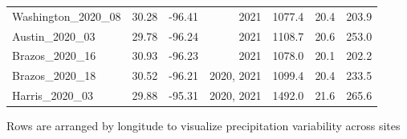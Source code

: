 \begin{table}
{\begin{tabular}{p{5cm}p{3cm}p{3cm}p{3cm}p{3cm}p{3cm}p{3cm}}
            \multicolumn{1}{l}{Washington\_2020\_08} 
            & \multicolumn{1}{r}{30.28}
            & \multicolumn{1}{r}{-96.41}
            & \multicolumn{1}{r}{2021}
            & \multicolumn{1}{r}{1077.4}
            & \multicolumn{1}{r}{20.4}
            & \multicolumn{1}{r}{203.9}
            \\

            \multicolumn{1}{l}{Austin\_2020\_03} 
            & \multicolumn{1}{r}{29.78}
            & \multicolumn{1}{r}{-96.24}
            & \multicolumn{1}{r}{2021}
            & \multicolumn{1}{r}{1108.7}
            & \multicolumn{1}{r}{20.6}
            & \multicolumn{1}{r}{253.0}
            \\

            \multicolumn{1}{l}{Brazos\_2020\_16} 
            & \multicolumn{1}{r}{30.93}
            & \multicolumn{1}{r}{-96.23}
            & \multicolumn{1}{r}{2021}
            & \multicolumn{1}{r}{1078.0}
            & \multicolumn{1}{r}{20.1}
            & \multicolumn{1}{r}{202.2}
            \\

            \multicolumn{1}{l}{Brazos\_2020\_18} 
            & \multicolumn{1}{r}{30.52}
            & \multicolumn{1}{r}{-96.21}
            & \multicolumn{1}{r}{2020, 2021}
            & \multicolumn{1}{r}{1099.4}
            & \multicolumn{1}{r}{20.4}
            & \multicolumn{1}{r}{233.5}
            \\

            \multicolumn{1}{l}{Harris\_2020\_03} 
            & \multicolumn{1}{r}{29.88}
            & \multicolumn{1}{r}{-95.31}
            & \multicolumn{1}{r}{2020, 2021}
            & \multicolumn{1}{r}{1492.0}
            & \multicolumn{1}{r}{21.6}
            & \multicolumn{1}{r}{265.6}
            \\
            \hline

        \end{tabular}}
        \label{tab:table4.1}
\end{table}
\noindent *Rows are arranged by longitude to visualize precipitation variability across sites
\clearpage

